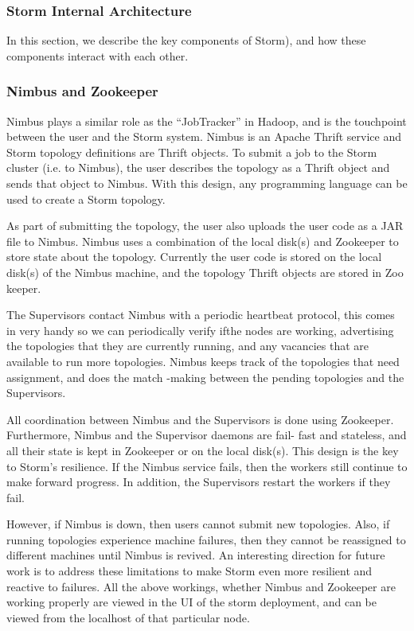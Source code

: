 \documentclass[9pt,twocolumn,twoside]{../../styles/osajnl}
\begin{document}
\subsubsection{Storm Internal Architecture}
In this section, we describe the key components of Storm), and how
these components interact with each other.

\subsubsection{Nimbus and Zookeeper}
Nimbus plays a similar role as the “JobTracker” in Hadoop, and is the
touchpoint between the user and the Storm system. Nimbus is an Apache
Thrift service and Storm topology definitions are Thrift objects.  To
submit a job to the Storm cluster (i.e. to Nimbus), the user describes
the topology as a Thrift object and sends that object to Nimbus. With
this design, any programming language can be used to create a Storm
topology.

As part of submitting the topology, the user also uploads the user
code as a JAR file to Nimbus. Nimbus uses a combination of the local
disk(s) and Zookeeper to store state about the topology. Currently the
user code is stored on the local disk(s) of the Nimbus machine, and
the topology Thrift objects are stored in Zoo keeper.

The Supervisors contact Nimbus with a periodic heartbeat protocol,
this comes in very handy so we can periodically verify ifthe nodes are
working, advertising the topologies that they are currently running,
and any vacancies that are available to run more topologies. Nimbus
keeps track of the topologies that need assignment, and does the match
-making between the pending topologies and the Supervisors.

All coordination between Nimbus and the Supervisors is done using
Zookeeper. Furthermore, Nimbus and the Supervisor daemons are fail-
fast and stateless, and all their state is kept in Zookeeper or on the
local disk(s). This design is the key to Storm’s resilience. If the
Nimbus service fails, then the workers still continue to make forward
progress. In addition, the Supervisors restart the workers if they
fail.

However, if Nimbus is down, then users cannot submit new topologies.
Also, if running topologies experience machine failures, then they
cannot be reassigned to different machines until Nimbus is revived.
An interesting direction for future work is to address these
limitations to make Storm even more resilient and reactive to
failures. All the above workings, whether Nimbus and Zookeeper are
working properly are viewed in the UI of the storm deployment, and can
be viewed from the localhost of that particular node.
\end{document}
